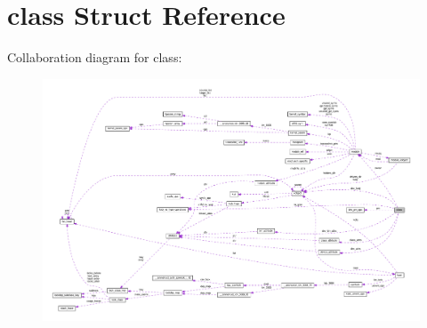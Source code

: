 \hypertarget{structclass}{}\section{class Struct Reference}
\label{structclass}


Collaboration diagram for class\+:
\nopagebreak
\begin{figure}[H]
\begin{center}
\leavevmode
\includegraphics[width=350pt]{structclass__coll__graph}
\end{center}
\end{figure}
